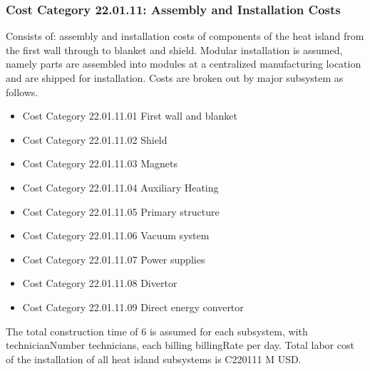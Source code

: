 \subsubsection*{Cost Category 22.01.11: Assembly and Installation Costs}

Consists of: assembly and installation costs of components of the heat island from the first wall through to blanket and shield. Modular installation is assumed, namely parts are assembled into modules at a centralized manufacturing location and are shipped for installation. Costs are broken out by major subsystem as follows.

\begin{itemize}
    \item Cost Category 22.01.11.01 First wall and blanket
    \item Cost Category 22.01.11.02 Shield
    \item Cost Category 22.01.11.03 Magnets
    \item Cost Category 22.01.11.04 Auxiliary Heating
    \item Cost Category 22.01.11.05 Primary structure
    \item Cost Category 22.01.11.06 Vacuum system
    \item Cost Category 22.01.11.07 Power supplies
    \item Cost Category 22.01.11.08 Divertor
    \item Cost Category 22.01.11.09 Direct energy convertor
\end{itemize}

The total construction time of 6 is assumed for each subsystem, with technicianNumber technicians, each billing billingRate per day.  Total labor cost of the installation of all heat island subsystems is C220111 M USD.